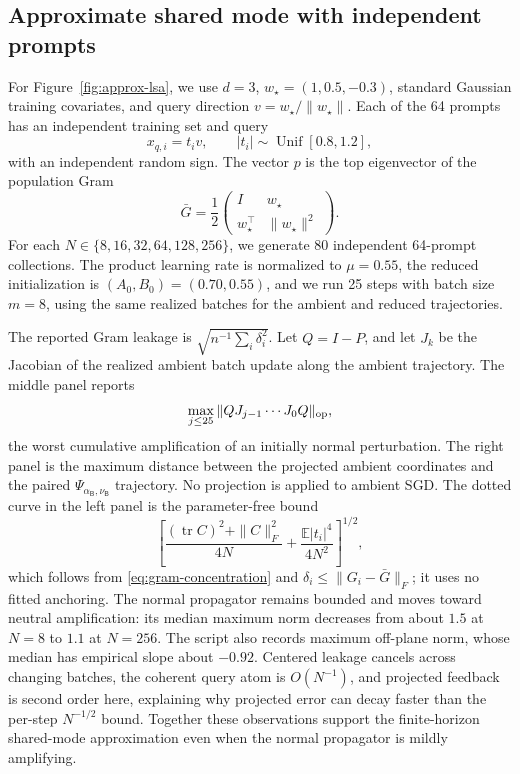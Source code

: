 \documentclass[11pt]{article}
\newcommand{\E}{\mathbb E}
\begin{document}
\subsection{Approximate shared mode with independent prompts}

For Figure~\ref{fig:approx-lsa}, we use \(d=3\),
\(w_\star=(1,0.5,-0.3)\), standard Gaussian training covariates, and query
direction \(v=w_\star/\|w_\star\|\).  Each of the 64 prompts has an
independent training set and query
\[
x_{q,i}=t_i v,\qquad
|t_i|\sim\operatorname{Unif}[0.8,1.2],
\]
with an independent random sign.  The vector \(p\) is the top eigenvector of
the population Gram
\[
\bar G=\frac12
\begin{pmatrix}I&w_\star\\w_\star^\top&\|w_\star\|^2\end{pmatrix}.
\]
For each \(N\in\{8,16,32,64,128,256\}\), we generate 80 independent
64-prompt collections.  The product learning rate is normalized to
\(\mu=0.55\), the reduced initialization is \((A_0,B_0)=(0.70,0.55)\), and
we run 25 steps with batch size \(m=8\), using the same realized batches for
the ambient and reduced trajectories.

The reported Gram leakage is
\(\sqrt{n^{-1}\sum_i\delta_i^2}\).  Let \(Q=I-P\), and let \(J_k\) be the
Jacobian of the realized ambient batch update along the ambient trajectory.
The middle panel reports
\[
\max_{j\le25}\|QJ_{j-1}\cdots J_0Q\|_{\rm op},
\]
the worst cumulative amplification of an initially normal perturbation.
The right panel is the maximum distance between the projected ambient
coordinates and the paired
\(\Psi_{\alpha_{\mathsf B},\nu_{\mathsf B}}\) trajectory.  No projection is
applied to ambient SGD\@.  The dotted curve in the left panel is the
parameter-free bound
\[
\left[
\frac{(\operatorname{tr}C)^2+\|C\|_F^2}{4N}
+\frac{\E|t_i|^4}{4N^2}
\right]^{1/2},
\]
which follows from \eqref{eq:gram-concentration} and
\(\delta_i\le\|G_i-\bar G\|_F\); it uses no fitted anchoring.  The normal
propagator remains bounded and moves toward neutral amplification: its
median maximum norm decreases from about \(1.5\) at \(N=8\) to \(1.1\) at
\(N=256\).  The script also records maximum off-plane norm, whose median has
empirical slope about \(-0.92\).  Centered leakage cancels across changing
batches, the coherent query atom is \(O(N^{-1})\), and projected feedback is
second order here, explaining why projected error can decay faster than the
per-step \(N^{-1/2}\) bound.  Together these observations support the
finite-horizon shared-mode approximation even when the normal propagator is
mildly amplifying.
\end{document}
